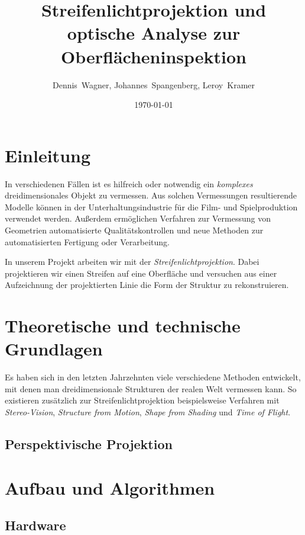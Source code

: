 \documentclass[ngerman,a4paper]{scrartcl}
\title%
{
	Streifenlichtprojektion und optische Analyse zur Oberflächeninspektion
}
\author[D. Wagner, J. Spangenberg, L. Kramer]
{
	Dennis~Wagner,
	Johannes~Spangenberg,
	Leroy~Kramer
}
\date{\today}
\begin{document}

\tableofcontents
\newpage


\section{Einleitung}

In verschiedenen Fällen ist es hilfreich oder notwendig ein \emph{komplexes} dreidimensionales Objekt zu vermessen. Aus solchen Vermessungen resultierende Modelle können in der Unterhaltungsindustrie für die Film- und Spielproduktion verwendet werden. Außerdem ermöglichen Verfahren zur Vermessung von Geometrien automatisierte Qualitätskontrollen und neue Methoden zur automatisierten Fertigung oder Verarbeitung.

In unserem Projekt arbeiten wir mit der \emph{Streifenlichtprojektion}. Dabei projektieren wir einen Streifen auf eine Oberfläche und versuchen aus einer Aufzeichnung der projektierten Linie die Form der Struktur zu rekonstruieren.


\section{Theoretische und technische Grundlagen}

Es haben sich in den letzten Jahrzehnten viele verschiedene Methoden entwickelt, mit denen man dreidimensionale Strukturen der realen Welt vermessen kann. So existieren zusätzlich zur Streifenlichtprojektion beispielsweise Verfahren mit \emph{Stereo-Vision}, \emph{Structure from Motion}, \emph{Shape from Shading} und \emph{Time of Flight}.

\subsection{Perspektivische Projektion}


\section{Aufbau und Algorithmen}

\subsection{Hardware}
\end{document}
